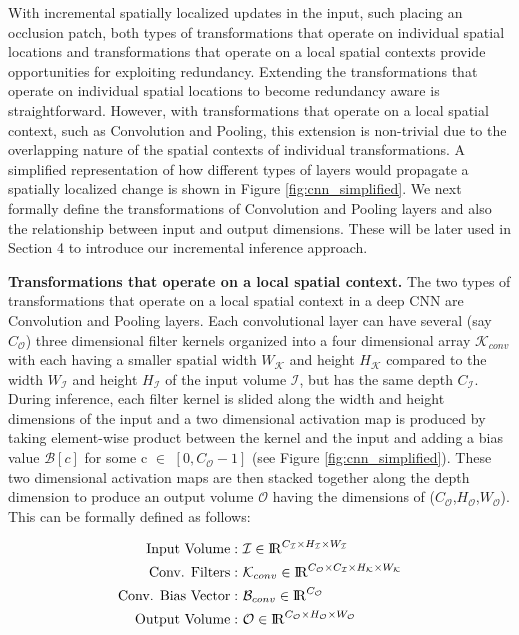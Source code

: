 With incremental spatially localized updates in the input, such placing an occlusion patch, both types of transformations that operate on individual spatial locations and transformations that operate on a local spatial contexts provide opportunities for exploiting redundancy. Extending the transformations that operate on individual spatial locations to become redundancy aware is straightforward. However, with transformations that operate on a local spatial context, such as Convolution and Pooling, this extension is non-trivial due to the overlapping nature of the spatial contexts of individual transformations. A simplified representation of how different types of layers would propagate a spatially localized change is shown in Figure \ref{fig:cnn_simplified}. We next formally define the transformations of Convolution and Pooling layers and also the relationship between input and output dimensions.
These will be later used in Section 4 to introduce our incremental inference approach.


\vspace{2mm}
\noindent \textbf{Transformations that operate on a local spatial context.} The two types of transformations that operate on a local spatial context in a deep CNN are Convolution and Pooling layers.
Each convolutional layer can have several (say $C_{\mathcal{O}}$) three dimensional filter kernels organized into a four dimensional array $\mathcal{K}_{conv}$ with each having a smaller spatial width $W_\mathcal{K}$ and height $H_\mathcal{K}$ compared to the width $W_{\mathcal{I}}$ and height $H_{\mathcal{I}}$ of the input volume $\mathcal{I}$, but has the same depth $C_{\mathcal{I}}$.
During inference, each filter kernel is slided along the width and height dimensions of the input and a two dimensional activation map is produced by taking element-wise product between the kernel and the input and adding a bias value $\mathcal{B}[c]$ for some c $\in$ $[0, C_{\mathcal{O}}-1]$ (see Figure \ref{fig:cnn_simplified}).
These two dimensional activation maps are then stacked together along the depth dimension to produce an output volume $\mathcal{O}$ having the dimensions of ($C_{\mathcal{O}}$,$H_{\mathcal{O}}$,$W_{\mathcal{O}}$). This can be formally defined as follows:

\begin{align}
\text{Input Volume}:&~ \mathcal{I} \in \mathcal{\rm I\!R}^{C_{\mathcal{I}} \times H_{\mathcal{I}} \times W_{\mathcal{I}}}\\
\text{Conv. Filters}:&~ \mathcal{K}_{conv} \in \mathcal{\rm I\!R}^{C_{\mathcal{O}} \times C_{\mathcal{I}} \times H_{\mathcal{K}} \times W_{\mathcal{K}}}\\
\text{Conv. Bias Vector}:&~ \mathcal{B}_{conv} \in \mathcal{\rm I\!R}^{C_{\mathcal{O}}}\\
\text{Output Volume}:&~ \mathcal{O} \in \mathcal{\rm I\!R}^{C_{\mathcal{O}} \times H_{\mathcal{O}} \times W_{\mathcal{O}}}
\end{align}

